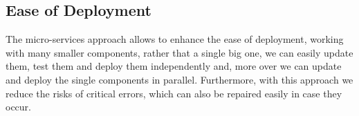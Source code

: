 \subsection{Ease of Deployment}
The micro-services approach allows to enhance the ease of deployment, working with many smaller components, rather that a single big one, we can easily update them, test them and deploy them independently and, more over we can update and deploy the single components in parallel. Furthermore, with this approach we reduce the risks of critical errors, which can also be repaired easily in case they occur.